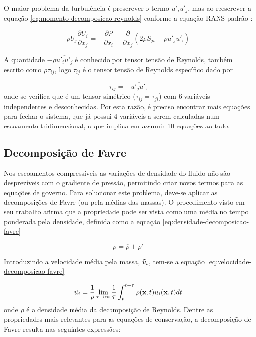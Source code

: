 O maior problema da turbulência é prescrever o termo \(\overline{u'_{i}u'_{j}}\), mas ao reescrever a equação \ref{eq:momento-decomposicao-reynolds} conforme a equação RANS padrão \cite{Wilcox2006}:

\begin{equation}
	\rho U_{j}\frac{\partial U_i}{\partial x_j} = -\frac{\partial P}{\partial x_i} + \frac{\partial}{\partial x_j}\left(2\mu S_{ji} - \rho\overline{u'_j u'_i} \right)
\end{equation}

A quantidade \(-\rho\overline{u'_{i}u'_{j}}\) é conhecido por tensor tensão de Reynolds, também escrito como \(\rho\tau_{ij}\), logo \(\tau_{ij}\) é o tensor tensão de Reynolds específico dado por

\begin{equation}
	\tau_{ij} = -\overline{u'_j u'_i}
\end{equation}
%
onde se verifica que é um tensor simétrico (\(\tau_{ij} = \tau_{ji}\)) com 6 variáveis independentes e desconhecidas. Por esta razão, é preciso encontrar mais equações para fechar o sistema, que já possui 4 variáveis a serem calculadas num escoamento tridimensional, o que implica em assumir 10 equações ao todo.

\subsection{Decomposição de Favre}

Nos escoamentos compressíveis as variações de densidade do fluido não são desprezíveis com o gradiente de pressão, permitindo criar novos termos para as equações de governo. Para solucionar este problema, deve-se aplicar as decomposições de Favre (ou pela médias das massas). O procedimento visto em seu trabalho afirma que a propriedade pode ser vista como uma média no tempo ponderada pela densidade, definida como a equação \ref{eq:densidade-decomposicao-favre}

\begin{equation} 
	\label{eq:densidade-decomposicao-favre}
    \rho = \overline{\rho} + \rho'
\end{equation}

Introduzindo a velocidade média pela massa, \(\Tilde{u}_i\), tem-se a equação \ref{eq:velocidade-decomposicao-favre}

\begin{equation}
	\label{eq:velocidade-decomposicao-favre}
	\Tilde{u_{i}} = \frac{1}{\overline{\rho}}\lim_{\tau \rightarrow \infty} \frac{1}{\tau}\int_{t}^{t+\tau}\rho(\textbf{x},t)u_i(\textbf{x},t)dt
\end{equation}
%
onde \(\overline{\rho}\) é a densidade média da decomposição de Reynolds. Dentre as propriedades mais relevantes para as equações de conservação, a decomposição de Favre resulta nas seguintes expressões:

